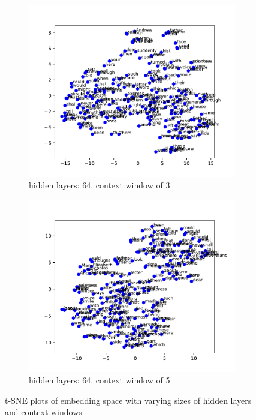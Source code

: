 \documentclass[12pt]{article} \usepackage{COSC420style} \usepackage{soul}
\begin{document}
\begin{figure}[htbp]
\begin{subfigure}[b]{0.45\textwidth}
		\label{fig:32_4}
	\end{subfigure}
	\newline %
	\begin{subfigure}[b]{0.45\textwidth}
		\includegraphics[width=\textwidth]{./figures/dim_64_ctx_3_embedding.pdf}
		\caption{hidden layers: 64, context window of 3}
		\label{fig:64_3}
	\end{subfigure}
	\begin{subfigure}[b]{0.45\textwidth}
		\includegraphics[width=\textwidth]{./figures/dim_64_ctx_5_embedding.pdf}
		\caption{hidden layers: 64, context window of 5}
		\label{fig:64_5}
	\end{subfigure}
	\caption{t-SNE plots of embedding space with varying sizes of hidden layers and context
		windows}
	\label{fig:small_embeddings}
\end{figure}
\end{document}

